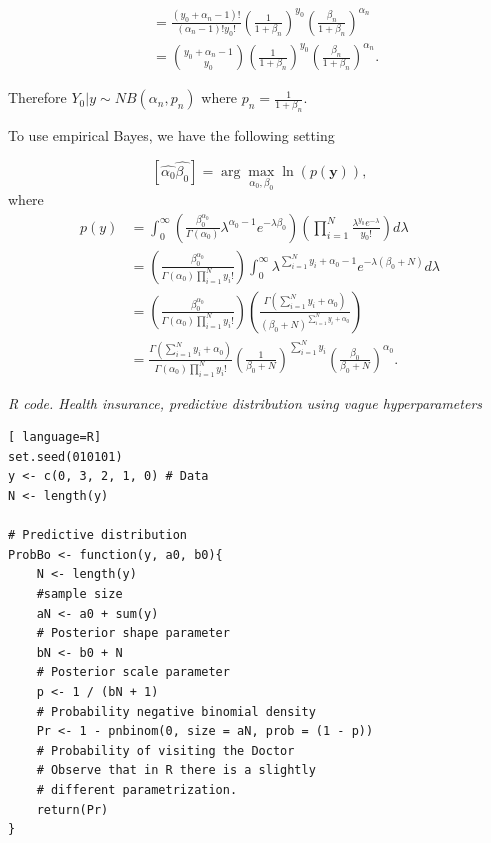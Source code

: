 \begin{enumerate}[leftmargin=*]
\begin{align}
	& = \frac{\left( y_0 + \alpha_n - 1\right)!}{\left( \alpha_n - 1\right)! y_0 ! } \left( \frac{1}{1 + \beta_n}\right)^{y_0} \left(\frac{\beta_n}{1 + \beta_n} \right)^{\alpha_n} \nonumber \\	
	& = \binom{y_0 + \alpha_n - 1}{y_0} \left( \frac{1}{1 + \beta_n}\right)^{y_0} \left(\frac{\beta_n}{1 + \beta_n} \right)^{\alpha_n}. \nonumber 
\end{align}

Therefore $Y_0 | y \sim NB(\alpha_n, p_n) $ where $p_n = \frac{1}{1 + \beta_n}$.

To use empirical Bayes, we have the following setting

\begin{equation*}
	\left[ \hat{\alpha_0} \hat{\beta_0}\right] = \arg \max_{\alpha_0, \beta_0} \ln (p(\textbf{y})), 
\end{equation*}
where
\begin{align}
	p(y) & = \int_{0}^{\infty} \left( \frac{\beta_0^{\alpha_0}}{\Gamma(\alpha_0)} \lambda^{\alpha_0 - 1} e^{-\lambda \beta_0} \right) \left(  \prod_{i = 1}^{N} \frac{\lambda^{y_0} e^{-\lambda}}{y_0!} \right)  d\lambda \\
	& = \left(  \frac{\beta_0^{\alpha_0}}{\Gamma(\alpha_0) \prod_{i = 1}^{N} y_i !} \right) \int_{0}^{\infty}\lambda^{\sum_{i = 1}^{N} y_i + \alpha_0 - 1} e^{-\lambda\left( \beta_0 + N \right)} d\lambda \nonumber \\
	& = \left(  \frac{\beta_0^{\alpha_0}}{\Gamma(\alpha_0) \prod_{i = 1}^{N} y_i !} \right) \left(   \frac{\Gamma\left( \sum_{i=1}^{N} y_i + \alpha_0 \right) }{\left(\beta_0 + N\right)^{\sum_{i=1}^{N} y_i + \alpha_0} } 	\right) \nonumber \\
	& = \frac{\Gamma\left( \sum_{i=1}^{N} y_i + \alpha_0 \right)}{\Gamma(\alpha_0) \prod_{i = 1}^{N} y_i !} \left( \frac{1}{\beta_0 + N}\right)^{\sum_{i=1}^{N} y_i} \left(\frac{\beta_0}{\beta_0 + N} \right)^{\alpha_0}.\nonumber   
\end{align}

\begin{tcolorbox}[enhanced,width=4.67in,center upper,
	fontupper=\large\bfseries,drop shadow southwest,sharp corners]
	\textit{R code. Health insurance, predictive distribution using vague hyperparameters}
\begin{VF}
\begin{lstlisting}[ language=R]
set.seed(010101)
y <- c(0, 3, 2, 1, 0) # Data
N <- length(y)

# Predictive distribution
ProbBo <- function(y, a0, b0){
	N <- length(y) 
	#sample size
	aN <- a0 + sum(y) 
	# Posterior shape parameter
	bN <- b0 + N 
	# Posterior scale parameter
	p <- 1 / (bN + 1) 
	# Probability negative binomial density
	Pr <- 1 - pnbinom(0, size = aN, prob = (1 - p)) 
	# Probability of visiting the Doctor
	# Observe that in R there is a slightly 
	# different parametrization.
	return(Pr)
} 


\end{lstlisting}
\end{VF}
\end{tcolorbox}
\end{enumerate}
